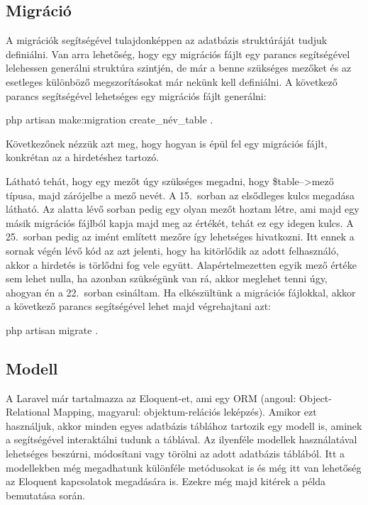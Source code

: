 \documentclass[]{thesis-ekf}
\theoremstyle{definition}
\theoremstyle{remark}
\begin{document}
	\subsection{Migráció}
		A migrációk segítségével tulajdonképpen az adatbázis struktúráját tudjuk definiálni. Van arra lehetőség, hogy egy migrációs fájlt egy parancs segítségével lelehessen generálni struktúra szintjén, de már a benne szükséges mezőket és az esetleges különböző megszorításokat már nekünk kell definiálni. A következő parancs segítségével lehetséges egy migrációs fájlt generálni:
		\begin{center} 
			php artisan make:migration create\_név\_table .
		\end{center}
		Következőnek nézzük azt meg, hogy hogyan is épül fel egy migrációs fájlt, konkrétan az a hirdetéshez tartozó.
	
		
		
		Látható tehát, hogy egy mezőt úgy szükséges megadni, hogy \$table-->mező típusa, majd zárójelbe a mező nevét. A 15.~sorban az elsődleges kulcs megadása látható. Az alatta lévő sorban pedig egy olyan mezőt hoztam létre, ami majd egy másik migrációs fájlból kapja majd meg az értékét, tehát ez egy idegen kulcs. A 25.~sorban pedig az imént említett mezőre így lehetséges hivatkozni. Itt ennek a sornak végén lévő kód az azt jelenti, hogy ha kitörlődik az adott felhasználó, akkor a hirdetés is törlődni fog vele együtt. Alapértelmezetten egyik mező értéke sem lehet nulla, ha azonban szükségünk van rá, akkor meglehet tenni úgy, ahogyan én a 22.~sorban csináltam. Ha elkészültünk a migrációs fájlokkal, akkor a következő parancs segítségével lehet majd végrehajtani azt:
		\begin{center}
			php artisan migrate .
		\end{center}
	\subsection{Modell}
		A Laravel már tartalmazza az Eloquent-et, ami egy ORM (angoul: Object-Relational Mapping, magyarul: objektum-relációs leképzés). Amikor ezt használjuk, akkor minden egyes adatbázis táblához tartozik egy modell is, aminek a segítségével interaktálni tudunk a táblával. Az ilyenféle modellek használatával lehetséges beszúrni, módosítani vagy törölni az adott adatbázis táblából. Itt a modellekben még megadhatunk különféle metódusokat is és még itt van lehetőség az Eloquent kapcsolatok megadására is. Ezekre még majd kitérek a példa bemutatása során.\cite{Laravel}
		
\end{document}
